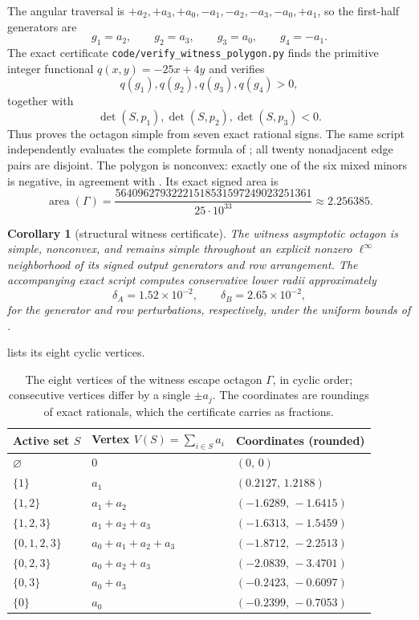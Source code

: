 \documentclass[11pt,twoside,leqno]{article}
\theoremstyle{plain}
\newtheorem{corollary}[corollary]{Corollary}
\theoremstyle{definition}
\theoremstyle{remark}
\begin{document}
The angular traversal is $+a_2,+a_3,+a_0,-a_1,-a_2,-a_3,-a_0,+a_1$, so the first-half generators are
\[
 g_1=a_2,\qquad g_2=a_3,\qquad g_3=a_0,\qquad g_4=-a_1.
\]
The exact certificate \texttt{code/verify\_witness\_polygon.py} finds the primitive integer functional $q(x,y)=-25x+4y$ and verifies
\[
 q(g_1),q(g_2),q(g_3),q(g_4)>0,
\]
together with
\[
 \det(S,p_1),\det(S,p_2),\det(S,p_3)<0.
\]
Thus  proves the octagon simple from seven exact rational signs.  The same script independently evaluates the complete formula of ; all twenty nonadjacent edge pairs are disjoint.  The polygon is nonconvex: exactly one of the six mixed minors is negative, in agreement with .  Its exact signed area is
\[
\operatorname{area}(\Gamma)
=\frac{56409627932221518531597249023251361}{25\cdot 10^{33}}
\approx 2.256385 .
\]
\begin{corollary}[structural witness certificate]\label{cor:witness-structural}
The witness asymptotic octagon is simple, nonconvex, and remains simple throughout an explicit nonzero $\ell^\infty$ neighborhood of its signed output generators and row arrangement.  The accompanying exact script computes conservative lower radii approximately
\[
 \delta_A=1.52\times10^{-2},\qquad
 \delta_B=2.65\times10^{-2},
\]
for the generator and row perturbations, respectively, under the uniform bounds of .
\end{corollary}

 lists its eight cyclic vertices.

\begin{table}[h]
\centering\small
\begin{tabular}{@{}lll@{}}
\toprule
Active set $S$ & Vertex $V(S)=\sum_{i\in S}a_i$ & Coordinates (rounded)\\
\midrule
$\varnothing$        & $0$                     & $(0,\,0)$\\
$\{1\}$              & $a_1$                   & $(0.2127,\,1.2188)$\\
$\{1,2\}$            & $a_1+a_2$               & $(-1.6289,\,-1.6415)$\\
$\{1,2,3\}$          & $a_1+a_2+a_3$           & $(-1.6313,\,-1.5459)$\\
$\{0,1,2,3\}$        & $a_0+a_1+a_2+a_3$       & $(-1.8712,\,-2.2513)$\\
$\{0,2,3\}$          & $a_0+a_2+a_3$           & $(-2.0839,\,-3.4701)$\\
$\{0,3\}$            & $a_0+a_3$               & $(-0.2423,\,-0.6097)$\\
$\{0\}$              & $a_0$                   & $(-0.2399,\,-0.7053)$\\
\bottomrule
\end{tabular}
\caption{The eight vertices of the witness escape octagon $\Gamma$, in cyclic order; consecutive vertices differ by a single $\pm a_j$. The coordinates are roundings of exact rationals, which the certificate carries as fractions.}
\label{tab:vertices}
\end{table}
\end{document}
